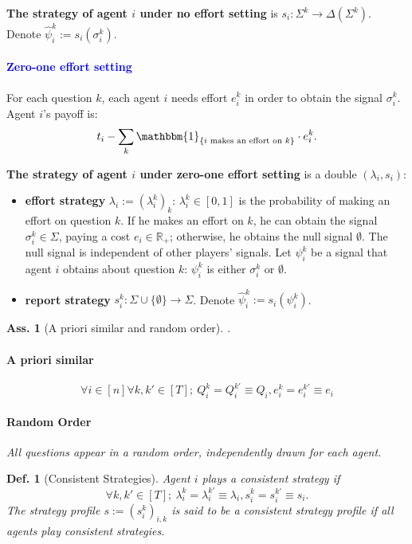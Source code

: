 \documentclass[11pt,a4paper,dvipdfmx]{article}
\theoremstyle{plain}
\newtheorem{df}{Def.}[section]
\newtheorem{ass}{Ass.}
\newcommand{\R}{\mathbb{R}}
\renewcommand{\hat}{\widehat}
\newcommand{\1}{\mathbbm{1}}
\newcommand{\kcomment}[1]{{\textcolor{blue}{#1}}}
\begin{document}
\textbf{The strategy of agent $i$ under no effort setting} is $s_i: \Sigma^{k} \to \Delta(\Sigma^k)$. Denote $\hat{\psi}_i^k := s_i(\sigma_i^k)$.



\paragraph{\kcomment{Zero-one effort setting}}
For each question $k$, each agent $i$ needs effort $e_i^k$ in order to obtain the signal $\sigma_i^k$. Agent $i$'s payoff is:
$$t_i - \sum_k \1_{\{\text{$i$ makes an effort on $k$}\}} \cdot e_i^k.$$

\textbf{The strategy of agent $i$ under zero-one effort setting} is a double $(\lambda_i, s_i)$:
\begin{itemize}
	\item \textbf{effort strategy} $\lambda_i := (\lambda_i^k)_k$: $\lambda_i^k \in [0,1]$ is the probability of making an effort on question $k$. If he makes an effort on $k$, he can obtain the signal $\sigma_i^k \in \Sigma$, paying a cost $e_i \in \R_+$; otherwise, he obtains the null signal $\emptyset$. The null signal is independent of other players' signals. Let $\psi_i^k$ be a signal that agent $i$ obtains about question $k$: $\psi_i^k$ is either $\sigma_i^k$ or $\emptyset$.
	\item \textbf{report strategy} $s_i^k: \Sigma \cup \{ \emptyset \} \to \Sigma$. Denote $\hat{\psi}_i^k := s_i(\psi_i^k)$.
\end{itemize}

\begin{ass}[A priori similar and random order]. \label{apriori}
\paragraph{A priori similar}
	\[
	\forall i \in [n] \forall k, k' \in [T]; \ Q_i^k = Q_i^{k'} \equiv Q_i, e_i^k = e_i^{k'} \equiv e_i
	\]
\paragraph{Random Order}
All questions appear in a random order, independently drawn for each agent.
\end{ass}

\begin{df}[Consistent Strategies]
	Agent $i$ plays a consistent strategy if 
	\[
	\forall k, k' \in [T]; \ \lambda_i^k = \lambda_i^{k'} \equiv \lambda_i, s_i^k = s_i^{k'} \equiv s_i.
	\]
	The strategy profile $s := (s_i^k)_{i,k}$ is said to be a consistent strategy profile if all agents play consistent strategies.
\end{df}
\end{document}
